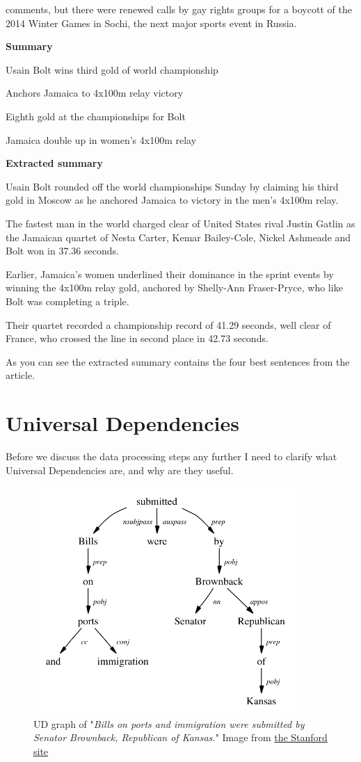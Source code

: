 {comments, but there were renewed calls by gay rights groups for a boycott of the 2014 Winter Games in Sochi, the next major sports event in Russia.

\textbf{Summary}

Usain Bolt wins third gold of world championship

Anchors Jamaica to 4x100m relay victory

Eighth gold at the championships for Bolt

Jamaica double up in women's 4x100m relay

\textbf{Extracted summary}

Usain Bolt rounded off the world championships Sunday by claiming his third gold in Moscow as he anchored Jamaica to victory in the men's 4x100m relay.

The fastest man in the world charged clear of United States rival Justin Gatlin as the Jamaican quartet of Nesta Carter, Kemar Bailey-Cole, Nickel Ashmeade and Bolt won in 37.36 seconds.

Earlier, Jamaica's women underlined their dominance in the sprint events by winning the 4x100m relay gold, anchored by Shelly-Ann Fraser-Pryce, who like Bolt was completing a triple.

Their quartet recorded a championship record of 41.29 seconds, well clear of France, who crossed the line in second place in 42.73 seconds.
}

As you can see the extracted summary contains the four best sentences from the article.
\section{Universal Dependencies}
Before we discuss the data processing steps any further I need to clarify what Universal Dependencies are, and why are they useful.

\begin{figure}[!ht]
	\centering
	\includegraphics[width=100mm, keepaspectratio]{figures/UD.png}
	\caption{UD graph of "\textit{Bills on ports and immigration were submitted by Senator Brownback, Republican of Kansas.}" Image from \href{https://nlp.stanford.edu/software/stanford-dependencies.shtml}{the Stanford site}}
	\label{fig:UD}
\end{figure}

